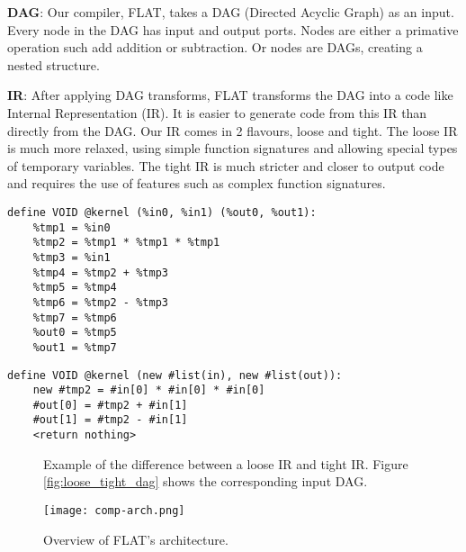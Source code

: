 \textbf{DAG}: Our compiler, FLAT, takes a DAG (Directed Acyclic Graph) as an input.
Every node in the DAG has input and output ports.
Nodes are either a primative operation such add addition or subtraction.
Or nodes are DAGs, creating a nested structure. 

\textbf{IR}: After applying DAG transforms, FLAT transforms the DAG into a code like Internal Representation (IR).
It is easier to generate code from this IR than directly from the DAG.
Our IR comes in 2 flavours, loose and tight.
The loose IR is much more relaxed, using simple function signatures and allowing special types of temporary variables.
The tight IR is much stricter and closer to output code and requires the use of features such as complex function signatures.

\newsavebox{\looseIRlisting}
\begin{lrbox}{\looseIRlisting}%
\begin{lstlisting}
define VOID @kernel (%in0, %in1) (%out0, %out1):
	%tmp1 = %in0
	%tmp2 = %tmp1 * %tmp1 * %tmp1
	%tmp3 = %in1
	%tmp4 = %tmp2 + %tmp3
	%tmp5 = %tmp4
	%tmp6 = %tmp2 - %tmp3
	%tmp7 = %tmp6
	%out0 = %tmp5
	%out1 = %tmp7
\end{lstlisting}
\endminipage
\end{lrbox}



\newsavebox{\tightIRlisting}
\begin{lrbox}{\tightIRlisting}%
\begin{lstlisting}
define VOID @kernel (new #list(in), new #list(out)):
	new #tmp2 = #in[0] * #in[0] * #in[0]
	#out[0] = #tmp2 + #in[1]
	#out[1] = #tmp2 - #in[1]
	<return nothing>
\end{lstlisting}
\endminipage
\end{lrbox}

\begin{figure}
\centering


\usebox{\measurebox}\qquad
    \begin{minipage}[][\ht\measurebox][c]{.26\textwidth}
       
    \end{minipage}
\caption{Example of the difference between a loose IR and tight IR. Figure \ref{fig:loose_tight_dag} shows the corresponding input DAG.} 
\label{fig:tight_loose}
\end{figure}

    \begin{figure}[h!]
    \begin{center}
        \texttt{[image: comp-arch.png]}
        \caption{Overview of FLAT's architecture.}
        \label{fig:arch}
    \end{center}
\end{figure}